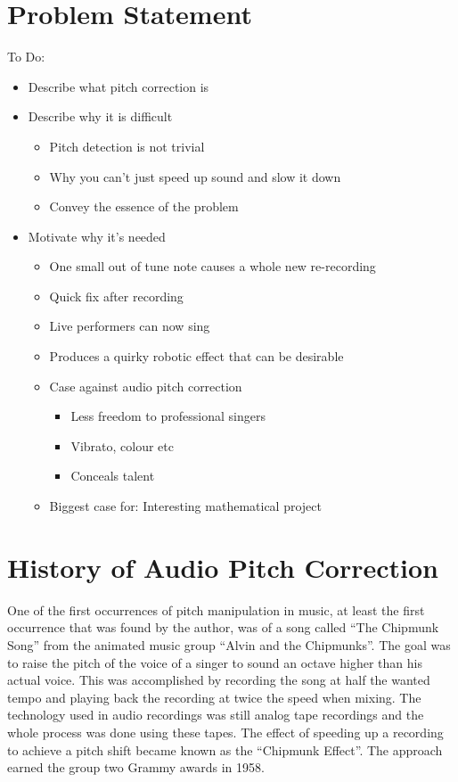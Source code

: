 
\section{Problem Statement}

\color{red}
To Do:
\begin{itemize}
	\item Describe what pitch correction is
	\item Describe why it is difficult
	\begin{itemize}
		\item Pitch detection is not trivial
		\item Why you can't just speed up sound and slow it down
		\item Convey the essence of the problem
	\end{itemize}
		\item Motivate why it's needed
		\begin{itemize}
		\item One small out of tune note causes a whole new re-recording
		\item Quick fix after recording
		\item Live performers can now sing
		\item Produces a quirky robotic effect that can be desirable
		\item Case against audio pitch correction
		\begin{itemize}
			\item Less freedom to professional singers
			\item Vibrato, colour etc
			\item Conceals talent
		\end{itemize}
		\item Biggest case for: Interesting mathematical project
	\end{itemize}
\end{itemize}
\color{black}

\section{History of Audio Pitch Correction}

One of the first occurrences of pitch manipulation in music, at least the first
occurrence that was found by the author, was of a song called ``The Chipmunk
Song'' from the animated music group ``Alvin and the Chipmunks''. The goal was to
raise the pitch of the voice of a singer to sound an octave higher than his actual
voice. This was accomplished by recording the song at half the wanted tempo and
playing back the recording at twice the speed when mixing. The technology used in
audio recordings was still analog tape recordings and the whole process was done
using these tapes. The effect of speeding up a recording to achieve a pitch
shift became known as the ``Chipmunk Effect''. The approach earned the group two
Grammy awards in 1958.

